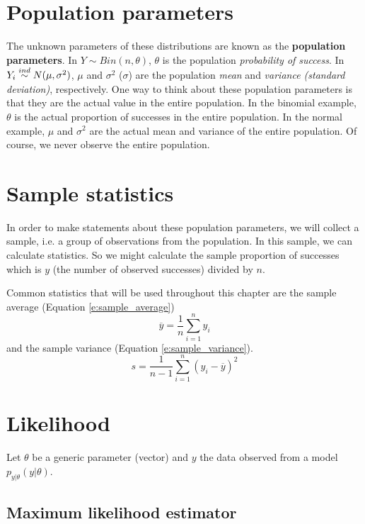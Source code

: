 \section{Population parameters}

The unknown parameters of these distributions are known as the {\bf population 
parameters}.
In $Y\sim Bin(n,\theta)$, $\theta$ is the  
population \emph{probability of success}.
In $Y_i\stackrel{ind}{\sim} N(\mu,\sigma^2)$, $\mu$ and $\sigma^2$ ($\sigma$) are the 
population \emph{mean} and \emph{variance (standard deviation)}, respectively.
One way to think about these population parameters is that they are the actual
value in the entire population.
In the binomial example,
$\theta$ is the actual proportion of successes in the entire population.
In the normal example, 
$\mu$ and $\sigma^2$ are the actual mean and variance of the entire population.
Of course, we never observe the entire population.

\section{Sample statistics}

In order to make statements about these population parameters, 
we will collect a sample, 
i.e. a group of observations from the population.
In this sample, 
we can calculate statistics. 
So we might calculate the sample proportion of successes which is $y$ 
(the number of observed successes) divided by $n$.

Common statistics that will be used throughout this chapter are the sample
average (Equation \eqref{e:sample_average}) 
\begin{equation}
\overline{y} = \frac{1}{n}\sum_{i=1}^n y_i
\label{e:sample_average}
\end{equation}
and the sample variance
(Equation \eqref{e:sample_variance}).
\begin{equation}
s = \frac{1}{n-1}\sum_{i=1}^n (y_i-\overline{y})^2
\label{e:sample_variance}
\end{equation}



\section{Likelihood}

Let $\theta$ be a generic parameter (vector) and $y$ the data observed from 
a model $p_{y|\theta}(y|\theta)$.

\subsection{Maximum likelihood estimator}

